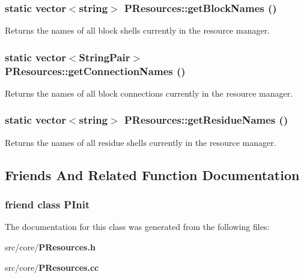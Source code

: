 \subsubsection{\setlength{\rightskip}{0pt plus 5cm}static vector$<$string$>$ PResources::get\-Block\-Names ()\hspace{0.3cm}{\tt  [inline, static]}}\label{classPResources_85737cfab6a2864781bfaca6e99c299e}


Returns the names of all block shells currently in the resource manager. 
\subsubsection{\setlength{\rightskip}{0pt plus 5cm}static vector$<${\bf String\-Pair}$>$ PResources::get\-Connection\-Names ()\hspace{0.3cm}{\tt  [inline, static]}}\label{classPResources_dd2cbfdb1c2edf0850f3e949194904ac}


Returns the names of all block connections currently in the resource manager. 
\subsubsection{\setlength{\rightskip}{0pt plus 5cm}static vector$<$string$>$ PResources::get\-Residue\-Names ()\hspace{0.3cm}{\tt  [inline, static]}}\label{classPResources_dbd549e77756f650cd4c329e5deec165}


Returns the names of all residue shells currently in the resource manager. 

\subsection{Friends And Related Function Documentation}
\subsubsection{\setlength{\rightskip}{0pt plus 5cm}friend class {\bf PInit}\hspace{0.3cm}{\tt  [friend]}}\label{classPResources_45e6e48cabad48de266ff9add6f69125}




The documentation for this class was generated from the following files:\begin{CompactItemize}
\item 
src/core/{\bf PResources.h}\item 
src/core/{\bf PResources.cc}\end{CompactItemize}
